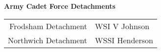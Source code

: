\vspace*{10mm}

\begin{center}
  \Large
  \textbf{Army Cadet Force Detachments}
\end{center}

\begin{center}
  \begin{tabular}{rl}
    Frodsham Detachment & WSI V Johnson \\
    Northwich Detachment & WSSI Henderson \\
  \end{tabular}
\end{center}
